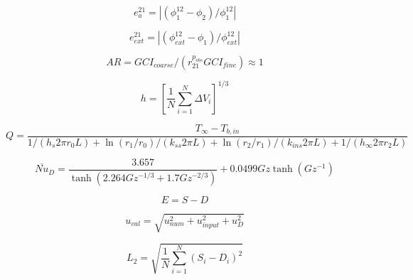 \[
e_a^{21}=\left\lvert(\phi_1^{12}-\phi_2)/\phi_1^{12}\right\rvert
\]

\[
e_{ext}^{21}=\left\lvert(\phi_{ext}^{12}-\phi_1)/\phi_{ext}^{12}\right\rvert
\]

\[
AR=GCI_{coarse}/(r_{21}^{p_{obs}}GCI_{fine})\approx1
\]

\[
h=\left[\frac{1}{N}\sum_{i=1}^{N}\Delta V_i\right]^{1/3}
\]

\[
Q=\frac{T_\infty-T_{b,in}}{1/(h_s2\pi r_0L)+\ln(r_1/r_0)/(k_{ss}2\pi L)+\ln(r_2/r_1)/(k_{ins}2\pi L)+1/(h_\infty2\pi r_2L)}
\]

\[
\overline{Nu}_D=\frac{3.657}{\tanh(2.264Gz^{-1/3}+1.7Gz^{-2/3})}+0.0499Gz\tanh(Gz^{-1})
\]

\[
E=S-D
\]

\[
u_{val}=\sqrt{u_{num}^2+u_{input}^2+u_D^2}
\]

\[
L_2=\sqrt{\frac{1}{N}\sum_{i=1}^{N}(S_i-D_i)^2}
\]

